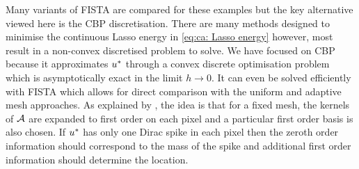 \documentclass[10pt,a4paper,onecolumn]{article}
\numberwithin{equation}{section}
\newcommand*{\varf}[1]{%
	\IfEqCase{#1}{%
		{0}{u}%
		{1}{v}%
		{2}{w}%
	}[u#1]%
}
\newcommand{\meshsize}{h}
\begin{document}
Many variants of FISTA are compared for these examples but the key alternative viewed here is the CBP discretisation. There are many methods designed to minimise the continuous Lasso energy in \eqref{eq:ca: Lasso energy} \cite{Bredies2013,Castro2016,Boyd2017,Catala2019} however, most result in a non-convex discretised problem to solve. We have focused on CBP because it approximates $\varf0^*$ through a convex discrete optimisation problem which is asymptotically exact in the limit $\meshsize\to0$. It can even be solved efficiently with FISTA which allows for direct comparison with the uniform and adaptive mesh approaches. As explained by \cite{Ekanadham2011, Duval2017b}, the idea is that for a fixed mesh, the kernels of $\mathcal{A}$ are expanded to first order on each pixel and a particular first order basis is also chosen. If $\varf0^*$ has only one Dirac spike in each pixel then the zeroth order information should correspond to the mass of the spike and additional first order information should determine the location.
\end{document}
